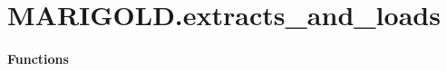 \documentclass[letterpaper,10pt,english]{sphinxmanual}
\begin{document}
\sphinxstepscope


\chapter{MARIGOLD.extracts\_and\_loads}
\label{\detokenize{modules/MARIGOLD.extracts_and_loads:module-MARIGOLD.extracts_and_loads}}\label{\detokenize{modules/MARIGOLD.extracts_and_loads:marigold-extracts-and-loads}}\label{\detokenize{modules/MARIGOLD.extracts_and_loads::doc}}\subsubsection*{Functions}
\end{document}
